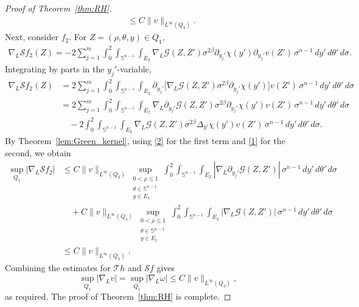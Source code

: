 \documentclass[12pt]{amsart}
\begin{document}
\begin{proof}[Proof of Theorem~\ref{thm:RH}]
\begin{align*}
    &\le C\|v\|_{L^\infty(Q_3)}.
\end{align*}
Next, consider $f_2$. For $Z=(\rho,\theta,y)\in Q_1$,
\begin{align*}
    \nabla_L\mathcal S f_2(Z) =
    -2\sum_{j=1}^m
    \int_0^2
    \int_{\mathbb S^{n-1}}
    \int_{E_2}
        \nabla_L\mathcal{G}(Z,Z')
        \sigma^{2\beta}
        \partial_{y_j'}\chi(y')
        \partial_{y_j'}v(Z')
    \,\sigma^{n-1}\, dy' \, d\theta' \, d\sigma .
\end{align*}
Integrating by parts in the $y_j'$-variable,
\begin{align*}
    \nabla_L\mathcal S f_2(Z)
    &= 2\sum_{j=1}^m
    \int_0^2
    \int_{\mathbb S^{n-1}}
    \int_{E_2}
        \partial_{y_j'}
        \bigl[
            \nabla_L\mathcal{G}(Z,Z')
            \sigma^{2\beta}
            \partial_{y_j'}\chi(y')
        \bigr]
        v(Z')
    \,\sigma^{n-1}\, dy' \, d\theta' \, d\sigma\\
    &= 2\sum_{j=1}^m
    \int_0^2
    \int_{\mathbb S^{n-1}}
    \int_{E_2}
        \nabla_L\partial_{y_j'}\mathcal{G}(Z,Z')
        \sigma^{2\beta}
        \partial_{y_j'}\chi(y')
        v(Z')
    \,\sigma^{n-1}\, dy' \, d\theta' \, d\sigma\\
    &\quad -2 \int_0^2 \int_{\mathbb S^{n-1}}
    \int_{E_2}
        \nabla_L\mathcal{G}(Z,Z')
        \sigma^{2\beta}
        \Delta_{y'}\chi(y')
        v(Z')
    \,\sigma^{n-1}\, dy' \, d\theta' \, d\sigma.
\end{align*}
By Theorem~\ref{lem:Green_kernel}, using \eqref{2} for the first term and \eqref{1} for the second, we obtain
\begin{align*}
    \sup_{Q_1}|\nabla_L \mathcal S f_2|
    &\le
    C\|v\|_{L^\infty(Q_3)}
    \sup_{\substack{0<\rho\leq1\\ \theta\in\mathbb S^{n-1}\\ y\in E_1}}
    \int_0^2
    \int_{\mathbb S^{n-1}}
    \int_{E_2}
        |\nabla_L \partial_{y_j'} \mathcal{G}(Z,Z')|
    \,\sigma^{n-1}\, dy' \, d\theta' \, d\sigma\\
    &\quad +
    C\|v\|_{L^\infty(Q_3)}
    \sup_{\substack{0<\rho\leq1\\ \theta\in\mathbb S^{n-1}\\ y\in E_1}}
    \int_0^2
    \int_{\mathbb S^{n-1}}
    \int_{E_2}
        |\nabla_L \mathcal{G}(Z,Z')|
    \,\sigma^{n-1}\, dy' \, d\theta' \, d\sigma\\
    &\le C\|v\|_{L^\infty(Q_3)}.
\end{align*}
Combining the estimates for $\mathcal T h$ and $\mathcal S f$ gives
\begin{equation*}
    \sup_{Q_1}|\nabla_L v| = \sup_{Q_1}|\nabla_L\omega|
    \le
    C\|v\|_{L^\infty(Q_3)},
\end{equation*}
as required. The proof of Theorem~\ref{thm:RH} is complete.
\end{proof}
\end{document}
